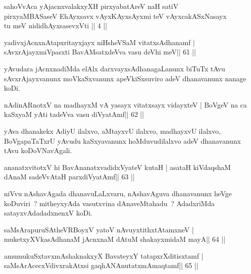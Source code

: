 \begin{kandikeshl}
sahoVvAca yAjacnxvalakxyXH pirxyabatAreV naH satiV\\
pirxyaMBASaseV EhAyxsavx vAyxKAyxsAyxmi teV vAyxcakASxNasayx\\
tu meV nididhAyxsasevxVti || 4 ||
\end{kandikeshl}

\begin{shl}
yadivxjAcnxnAtapxritayxjayx niHsheVSaM vitatxsAdhanamf |
sAvxrAjayxmiVpasxti BavAMsatxdeVva vasu deVhi meV\hfill || 61 ||
\end{shl}

\begin{artha}
yAvudara jAcnxnadiMda elAlx darxvayxsAdhanagaLanunx biTuTx tAvu sAvxrAjayxvanunx moVkaSxvanunx apeVkiSxsuviro adeV dhanavanunx nanage koDi.
\end{artha}

\begin{shl}
nA\s\s dinARnotxV na madhayxM vA yasayx vitatxsayx vidayxteV |
BoVgeV na ca kaSxyaM yAti tadeVva vasu diVyatAmf\hfill || 62 ||
\end{shl}

\begin{artha}
yAva dhanakekx AdiyU ilalxvo, aMtayxvU ilalxvo, madhayxvU ilalxvo, BoVgapaTaTxrU yAvudu kaSxyavanunx hoMduvudilalxvo adeV dhanavanunx tAvu koDoVNavAgali.
\end{artha}

\begin{shl}
ananatxvitotxV hi BavAnanatxvadidxVyateV kutaH |
asataH kiVdaqshaM dAnaM sadeVvAtaH parxdiVyatAmf\hfill || 63 ||
\end{shl}

\begin{artha}
niVvu nAshavAgada dhanavuLaLxvaru, nAshavAguva dhanavanunx heVge koDuviri~? mitheyxyAda vasutxvina dAnaveMtahadu~? AdadxriMda satayxvAdadadxnenxV koDi.
\end{artha}


\begin{shl}
saMsArapuruSAtheVRBoyxV yatoV nAvuyxtithxtAtamxneV |
muketxyXVkasAdhanaM jAcnxnaM dAtuM shakayxmidaM mayA\hfill || 64 ||
\end{shl}

\begin{shl}
amumukuSxtavxmAshaknakxyX BavateyxY tatapxrXditisxtamf |
saMsArAcecxVdivxrakAtx\s si gaqhANAnutatxmAmaqtamf\hfill || 65 ||
\end{shl}

